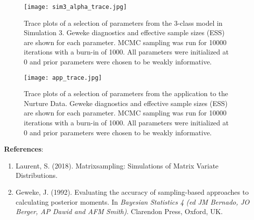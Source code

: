 \documentclass[useAMS,11pt]{article}
\newcommand{\1}{\mathbbm{1}}
\begin{document}
\begin{figure}[h]
\caption{\label{fig:sim3_trace} Trace plots of a selection of parameters from the 3-class model in Simulation 3. Geweke diagnostics and effective sample sizes (ESS) are shown for each parameter. MCMC sampling was run for 10000 iterations with a burn-in of 1000. All parameters were initialized at 0 and prior parameters were chosen to be weakly informative.}
\texttt{[image: sim3\_alpha\_trace.jpg]}
\end{figure}

\begin{figure}[h]
\caption{\label{fig:app_trace} Trace plots of a selection of parameters from the application to the Nurture Data. Geweke diagnostics and effective sample sizes (ESS) are shown for each parameter. MCMC sampling was run for 10000 iterations with a burn-in of 1000. All parameters were initialized at 0 and prior parameters were chosen to be weakly informative.}
\texttt{[image: app\_trace.jpg]}
\end{figure}

\clearpage

\textbf{References}:\\
\begin{enumerate}
\item Laurent, S. (2018). Matrixsampling: Simulations of Matrix Variate Distributions.
\item Geweke, J. (1992). Evaluating the accuracy of sampling-based approaches to calculating posterior moments. In {\em Bayesian Statistics 4 (ed JM Bernado, JO Berger, AP Dawid and AFM Smith)}. Clarendon Press, Oxford, UK.
\end{enumerate}
\end{document}
